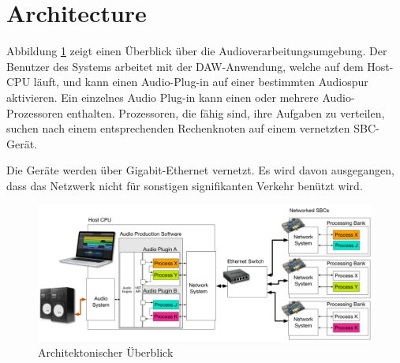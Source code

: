 \section{Architecture}

Abbildung \ref{fig:arch_01} zeigt einen Überblick über die Audioverarbeitungsumgebung. Der Benutzer des Systems arbeitet mit der DAW-Anwendung, welche auf dem Host-CPU läuft, und kann einen Audio-Plug-in auf einer bestimmten Audiospur aktivieren. Ein einzelnes Audio Plug-in kann einen oder mehrere Audio-Prozessoren enthalten. Prozessoren, die fähig sind, ihre Aufgaben zu verteilen, suchen nach einem entsprechenden Rechenknoten auf einem vernetzten SBC-Gerät.

Die Geräte werden über Gigabit-Ethernet vernetzt. Es wird davon ausgegangen, dass das Netzwerk nicht für sonstigen signifikanten Verkehr benützt wird.

\begin{figure}[H]
    \centering
    \includegraphics[width=\textwidth]{assets/architecture_01.pdf}
    \caption{Architektonischer Überblick}
    \label{fig:arch_01}
\end{figure}
